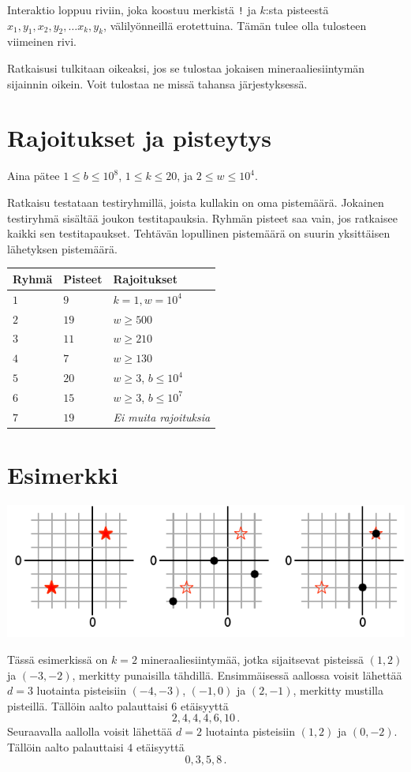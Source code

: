 Interaktio loppuu riviin, joka koostuu merkistä \texttt{!} ja $k$:sta pisteestä $x_1, y_1, x_2, y_2, \ldots x_k, y_k$, välilyönneillä erotettuina.
Tämän tulee olla tulosteen viimeinen rivi.

Ratkaisusi tulkitaan oikeaksi, jos se tulostaa jokaisen mineraaliesiintymän sijainnin oikein.
Voit tulostaa ne missä tahansa järjestyksessä.

\section*{Rajoitukset ja pisteytys}

Aina pätee
$1\leq b \leq 10^8$, %
$1 \leq k \leq 20$, %
ja
$2 \le w \le 10^4$. %

Ratkaisu testataan testiryhmillä, joista kullakin on oma pistemäärä.
Jokainen testiryhmä sisältää joukon testitapauksia.
Ryhmän pisteet saa vain, jos ratkaisee kaikki sen testitapaukset.
Tehtävän lopullinen pistemäärä on suurin yksittäisen lähetyksen pistemäärä.

\medskip
\begin{tabular}{lll}
Ryhmä & Pisteet & Rajoitukset \\\hline
  $1$ & $9$ & $k = 1, w = 10^4$\\
  $2$ & $19$ & $w \ge 500$\\
  $3$ & $11$ & $w \ge 210$\\
  $4$ & $7$ & $w \ge 130$\\
  $5$ & $20$ & $w \ge 3$, $b \le 10^4$\\
  $6$ & $15$ & $w \ge 3$, $b \le 10^7$\\
  $7$ & $19$ & \emph{Ei muita rajoituksia}
\end{tabular}

\section*{Esimerkki}

\includegraphics[width=.6\textwidth]{img/sample1.pdf}

Tässä esimerkissä on $k=2$ mineraaliesiintymää, jotka sijaitsevat pisteissä $(1,2)$ ja $(-3,-2)$, merkitty punaisilla tähdillä.
Ensimmäisessä aallossa voisit lähettää $d=3$ luotainta pisteisiin $(-4,-3)$, $(-1, 0)$ ja $(2,-1)$, merkitty mustilla pisteillä.
Tällöin aalto palauttaisi $6$ etäisyyttä \[
  2, 4, 4, 4, 6, 10\,.
\]
Seuraavalla aallolla voisit lähettää $d=2$ luotainta pisteisiin $(1,2)$ ja $(0,-2)$.
Tällöin aalto palauttaisi $4$ etäisyyttä \[
  0, 3, 5, 8\,.
\]

